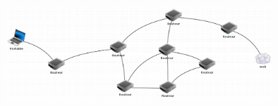 \documentclass[svgnames,11pt]{beamer}
\begin{document}
\begin{frame}
    \frametitle{}

    \begin{center}
        \centering
        \includegraphics[width=10cm]{ressources/reseau.png}
        \label{reseau}
    \end{center}

\end{frame}
\end{document}
